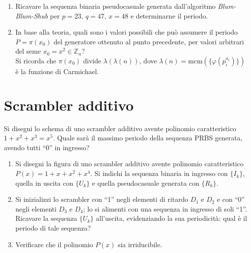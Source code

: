         \begin{enumerate}
            \item Ricavare la sequenza binaria pseudo\nbdash casuale generata dall'algoritmo \emph{Blum-Blum-Shub} 
                per $p=23,\, q=47,\, x=48$ e determinarne il periodo.
            \item In base alla teoria, quali sono i valori possibili che può assumere il periodo $P = \pi(x_0)$ del 
                generatore ottenuto al punto precedente, per valori arbitrari del seme $x_0 =x^2 \in\mathbb{Z}_n$?\\
                Si ricorda che $\pi(x_0)$ divide $\lambda(\lambda(n))$, dove 
                $\lambda(n)=\mathrm{mcm}\left(\{\varphi(p^{a_i}_i)\}\right)$ è la funzione di Carmichael.
        \end{enumerate}

    \bigskip
    \section{Scrambler additivo}
        Si disegni lo schema di uno scrambler additivo avente polinomio caratteristico $1+x^2 +x^3 =x^5$. Quale 
        sarà il massimo periodo della sequenza PRBS generata, avendo tutti ``0'' in ingresso?

        \begin{enumerate}
            \item Si disegni la figura di uno scrambler additivo avente polinomio caratteristico $P(x)= 1+x +x^2 +x^4$. 
                Si indichi la sequenza binaria in ingresso con $\{I_k\}$, quella in uscita con $\{U_k\}$ e quella 
                pseudo\nbdash casuale generata con $\{R_k\}$.
            \item Si inizializzi lo scrambler con  ``1'' negli elementi di ritardo $D_1$ e $D_2$ e con ``0'' negli elementi 
                $D_3$ e $D_4$; lo si alimenti con una sequenza in ingresso di soli ``1''. Ricavare la sequenza $\{U_k\}$ 
                all'uscita, evidenziando la sua periodicità: qual è il periodo di tale sequenza?
            \item Verificare che il polinomio $P(x)$ sia irriducibile.
        \end{enumerate}

